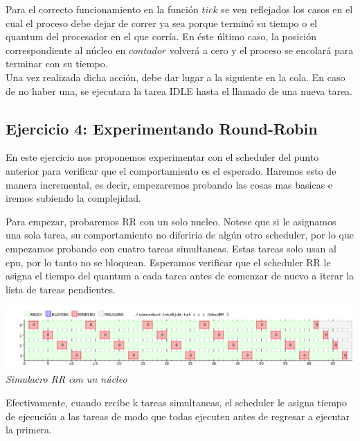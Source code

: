 Para el correcto funcionamiento en la funci\'on $tick$ se ven reflejados los casos en el cual el proceso debe 
dejar de correr ya sea porque termin\'o su tiempo o el quantum del procesador en el que corr\'ia. En \'este \'ultimo 
caso, la posici\'on correspondiente al n\'ucleo en $contador$ volver\'a a cero y el proceso se encolar\'a para terminar con su tiempo. 
\\Una vez realizada dicha acci\'on, debe dar lugar a la siguiente en la cola. En caso de no haber una, se ejecutara la tarea IDLE hasta el llamado de una nueva tarea.

\subsection{Ejercicio 4: Experimentando Round-Robin}

En este ejercicio nos proponemos experimentar con el scheduler del punto anterior para verificar que el comportamiento es el esperado. Haremos esto de 
manera incremental, es decir, empezaremos probando las cosas mas basicas e iremos subiendo la complejidad. 

Para empezar, probaremos RR con un solo nucleo. Notese que si le asignamos una sola tarea, su comportamiento no diferiria de alg\'un otro scheduler, por
lo que empezamos probando con cuatro tareas simultaneas. Estas tareas solo usan al cpu, por lo tanto no se bloquean. Esperamos 
verificar que el scheduler RR le asigna el tiempo del quantum a cada tarea antes de comenzar de nuevo a iterar la lista de tareas pendientes.

\vspace{\baselineskip}
\begin{center}
\includegraphics[scale=0.45]{../tp1/Test/resEj4Co1SB.png}
\\
\vspace{1pt}
\footnotesize\textit{Simulacro RR con un n\'ucleo}
\end{center}
\vspace{\baselineskip}

Efectivamente, cuando recibe k tareas simultaneas, el scheduler le asigna tiempo de ejecuci\'on a las tareas de modo que todas 
ejecuten antes de regresar a ejecutar la primera. 

